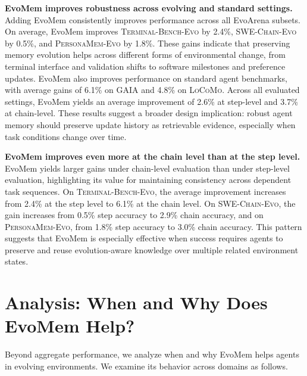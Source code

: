 \documentclass{llmxive}
\begin{document}
\textbf{EvoMem improves robustness across evolving and standard settings.} 
Adding EvoMem consistently improves performance across all EvoArena subsets. On average, EvoMem improves \textsc{Terminal-Bench-Evo} by 2.4\%, \textsc{SWE-Chain-Evo} by 0.5\%, and \textsc{PersonaMem-Evo} by 1.8\%. These gains indicate that preserving memory evolution helps across different forms of environmental change, from terminal interface and validation shifts to software milestones and preference updates. EvoMem also improves performance on standard agent benchmarks, with average gains of 6.1\% on \textsc{GAIA} and 4.8\% on \textsc{LoCoMo}. Across all evaluated settings, EvoMem yields an average improvement of 2.6\% at step-level and 3.7\% at chain-level. These results suggest a broader design implication: robust agent memory should preserve update history as retrievable evidence, especially when task conditions change over time.










\textbf{EvoMem improves even more at the chain level than at the step level.}
EvoMem yields larger gains under chain-level evaluation than under step-level evaluation, highlighting its value for maintaining consistency across dependent task sequences. On \textsc{Terminal-Bench-Evo}, the average improvement increases from 2.4\% at the step level to 6.1\% at the chain level. On \textsc{SWE-Chain-Evo}, the gain increases from 0.5\% step accuracy to 2.9\% chain accuracy, and on \textsc{PersonaMem-Evo}, from 1.8\% step accuracy to 3.0\% chain accuracy. This pattern suggests that EvoMem is especially effective when success requires agents to preserve and reuse evolution-aware knowledge over multiple related environment states.
















\section{Analysis: When and Why Does EvoMem Help?}
\label{sec:diagnostic_analysis}

Beyond aggregate performance, we analyze when and why EvoMem helps agents in evolving environments. We examine its behavior across domains as follows.
\end{document}
